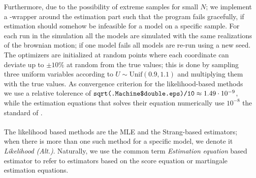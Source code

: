 Furthermore, due to the possibility of extreme samples for small $N$; we implement a -wrapper around the estimation part such that the program fails gracefully, if estimation should somehow be infeasible for a model on a specific sample. For each run in the simulation all the models are simulated with the same realizations of the brownian motion; if one model fails all models are re-run using a new seed. The optimizers are initialized at random points where each coordinate can deviate up to $\pm 10\%$ at random from the true values; this is done by sampling three uniform variables according to $U\sim\mathrm{Unif}(0.9, 1.1)$ and multiplying them with the true values. As convergence criterion for the likelihood-based methods we use a relative tolerence of $\texttt{sqrt(.Machine\$double.eps)/10}\approx 1.49\cdot 10^{-9}$, while the estimation equations that solves their equation numerically use $10^{-8}$ the standard of . \\\\
The likelihood based methods are the MLE and the Strang-based estimators; when there is more than one such method for a specific model, we denote it \textit{Likelihood (Alt.)}. Naturally, we use the common term \textit{Estimation equation} based estimator to refer to estimators based on the score equation or martingale estimation equations.
